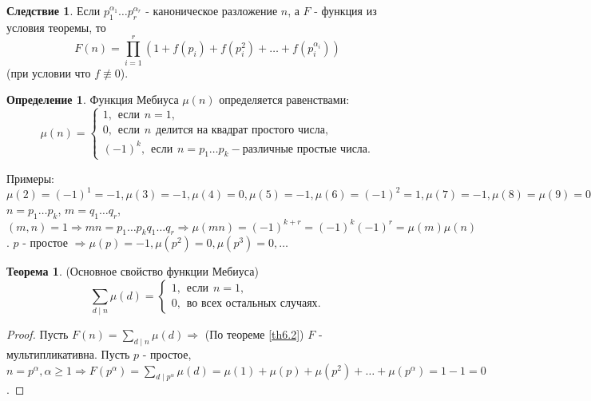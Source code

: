 \documentclass[a4paper, 12pt]{article}
\renewcommand{\div}{\mid}
\theoremstyle{definition}
\newtheorem{definition}{Определение}[section]
\newtheorem{theorem}{Теорема}[section]
\newtheorem*{consequense}{Следствие}
\begin{document}
    \begin{consequense}
        Если $p_1^{\alpha_1}\dots p_r^{\alpha_r}$ - каноническое разложение $n$, а $F$ - функция из условия теоремы, то
        $$F(n)=\prod\limits_{i=1}^{r}(1+f(p_i)+f(p_i^2)+\dots +f(p_i^{\alpha_i}))$$
        (при условии что $f\not\equiv 0$).
    \end{consequense}
    \begin{definition}
        Функция Мебиуса $\mu(n)$ определяется равенствами:
        \[\mu(n)=\begin{cases}
            1, \hspace{5pt} \text{если} \hspace{5pt} n=1,\\
            0, \hspace{5pt} \text{если} \hspace{5pt} n \hspace{5pt} \text{делится на квадрат простого числа},\\
            (-1)^k,\hspace{5pt} \text{если} \hspace{5pt} n=p_1\dots p_k - \text{различные простые числа}.
        \end{cases}\]
    \end{definition} 
    Примеры: $\mu(2)=(-1)^1=-1, \mu(3)=-1, \mu(4)=0, \mu(5)=-1, \mu(6)=(-1)^2=1, \mu(7)=-1, \mu(8)=\mu(9)=0, \mu(10)=(-1)^2=1$
    $n=p_1\dots p_k$, $m=q_1\dots q_r$, $(m,n)=1\Rightarrow mn=p_1\dots p_kq_1\dots q_r \Rightarrow \mu(mn)=(-1)^{k+r}=(-1)^k(-1)^r=\mu(m)\mu(n)$.
    $p$ - простое $\Rightarrow \mu(p)=-1, \mu(p^2)=0, \mu(p^3)=0, \dots$
    \begin{theorem}
        (Основное свойство функции Мебиуса) \label{th6.3}
        \[\sum\limits_{d\div n}\mu(d)=\begin{cases}
            1, \hspace{5pt} \text{если} \hspace{5pt} n=1,\\
            0, \hspace{5pt} \text{во всех остальных случаях}.
        \end{cases}\]
    \end{theorem} 
    \begin{proof}
        Пусть $F(n)=\sum\limits_{d\div n}\mu(d)\Rightarrow$ (По теореме \ref{th6.2}) $F$ - мультипликативна. Пусть $p$ - простое, $n=p^{\alpha}, \alpha\geq 1 \Rightarrow F(p^{\alpha})=\sum\limits_{d\div p^{\alpha}}\mu(d)=\mu(1)+\mu(p)+\mu(p^2)+\dots +\mu(p^{\alpha})=1-1=0$.
    \end{proof}
\end{document}
